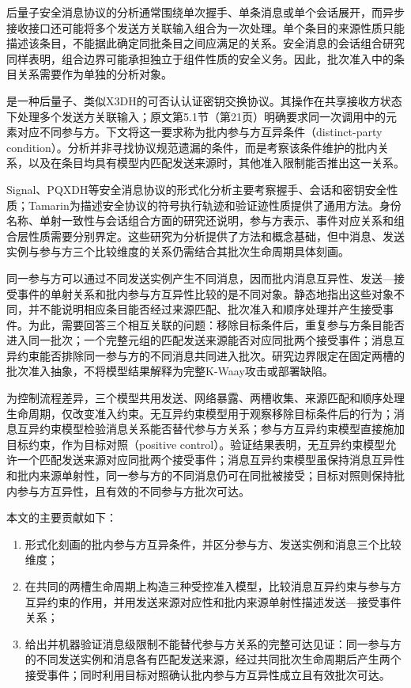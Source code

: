 后量子安全消息协议的分析通常围绕单次握手、单条消息或单个会话展开，而异步接收接口还可能将多个发送方关联输入组合为一次处理。单个条目的来源性质只能描述该条目，不能据此确定同批条目之间应满足的关系。安全消息的会话组合研究同样表明，组合边界可能承担独立于组件性质的安全义务\cite{cremers2023session}。因此，批次准入中的条目关系需要作为单独的分析对象。

\kwaay 是一种后量子、类似X3DH的可否认认证密钥交换协议\cite{collins2024kwaay}。其\batchreceive 操作在共享接收方状态下处理多个发送方关联输入；原文第5.1节（第21页）明确要求同一次调用中的元素对应不同参与方\cite{collins2024kwaayfull}。下文将这一要求称为批内参与方互异条件（distinct-party condition）。分析并非寻找协议规范遗漏的条件，而是考察该条件维护的批内关系，以及在条目均具有模型内匹配发送来源时，其他准入限制能否推出这一关系。

Signal、PQXDH等安全消息协议的形式化分析主要考察握手、会话和密钥安全性质\cite{cohngordon2020signal,bhargavan2024pqxdh}；Tamarin为描述安全协议的符号执行轨迹和验证迹性质提供了通用方法\cite{meier2013tamarin}。身份名称、单射一致性与会话组合方面的研究还说明，参与方表示、事件对应关系和组合层性质需要分别界定\cite{lupetti2006names,lowe1997hierarchy,cremers2023session}。这些研究为分析提供了方法和概念基础，但\batchreceive 中消息、发送实例与参与方三个比较维度的关系仍需结合其批次生命周期具体刻画。

同一参与方可以通过不同发送实例产生不同消息，因而批内消息互异性、发送—接受事件的单射关系和批内参与方互异性比较的是不同对象。静态地指出这些对象不同，并不能说明相应条目能否经过来源匹配、批次准入和顺序处理并产生接受事件。为此，需要回答三个相互关联的问题：移除目标条件后，重复参与方条目能否进入同一批次；一个完整元组的匹配发送来源能否对应同批两个接受事件；消息互异约束能否排除同一参与方的不同消息共同进入批次。研究边界限定在固定两槽的批次准入抽象，不将模型结果解释为完整K-Waay攻击或部署缺陷。

为控制流程差异，三个模型共用发送、网络暴露、两槽收集、来源匹配和顺序处理生命周期，仅改变准入约束。无互异约束模型用于观察移除目标条件后的行为；消息互异约束模型检验消息关系能否替代参与方关系；参与方互异约束模型直接施加目标约束，作为目标对照（positive control）。验证结果表明，无互异约束模型允许一个匹配发送来源对应同批两个接受事件；消息互异约束模型虽保持消息互异性和批内来源单射性，同一参与方的不同消息仍可在同批被接受；目标对照则保持批内参与方互异性，且有效的不同参与方批次可达。

本文的主要贡献如下：
\begin{enumerate}[label=\arabic*)]
  \item 形式化刻画\batchreceive 的批内参与方互异条件，并区分参与方、发送实例和消息三个比较维度；
  \item 在共同的两槽生命周期上构造三种受控准入模型，比较消息互异约束与参与方互异约束的作用，并用发送来源对应性和批内来源单射性描述发送—接受事件关系；
  \item 给出并机器验证消息级限制不能替代参与方关系的完整可达见证：同一参与方的不同发送实例和消息各有匹配发送来源，经过共同批次生命周期后产生两个接受事件；同时利用目标对照确认批内参与方互异性成立且有效批次可达。
\end{enumerate}

